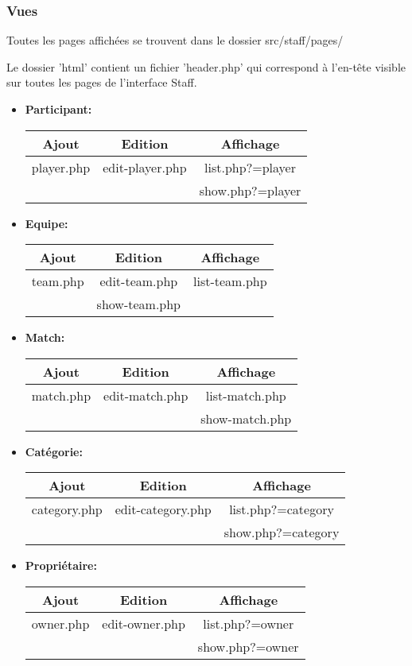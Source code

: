 \documentclass{article}
\begin{document}
\subsubsection{Vues}

Toutes les pages affichées se trouvent dans le dossier src/staff/pages/

Le dossier 'html' contient un fichier 'header.php' qui correspond à l'en-tête visible sur toutes les pages de l'interface Staff.




\begin{itemize}
\item{\textbf{Participant: }}
\begin{tabular}{ccc}
 Ajout & Edition & Affichage \\
 \hline
player.php & edit-player.php & list.php?=player\\
  &  & show.php?=player
\end{tabular}

\item{\textbf{Equipe: }}
\begin{tabular}{ccc}
 Ajout & Edition & Affichage \\
 \hline
team.php & edit-team.php & list-team.php\\
  & show-team.php
\end{tabular}

\item{\textbf{Match: }}
\begin{tabular}{ccc}
 Ajout & Edition & Affichage \\
 \hline
match.php & edit-match.php & list-match.php\\
  & & show-match.php
\end{tabular}

\item{\textbf{Catégorie: }}
\begin{tabular}{ccc}
 Ajout & Edition & Affichage \\
 \hline
category.php & edit-category.php & list.php?=category\\
  &  & show.php?=category
\end{tabular}

\item{\textbf{Propriétaire: }
\begin{tabular}{ccc}
 Ajout & Edition & Affichage \\
 \hline
owner.php & edit-owner.php & list.php?=owner\\
  &  & show.php?=owner
\end{tabular}

}
\end{itemize}
\end{document}
